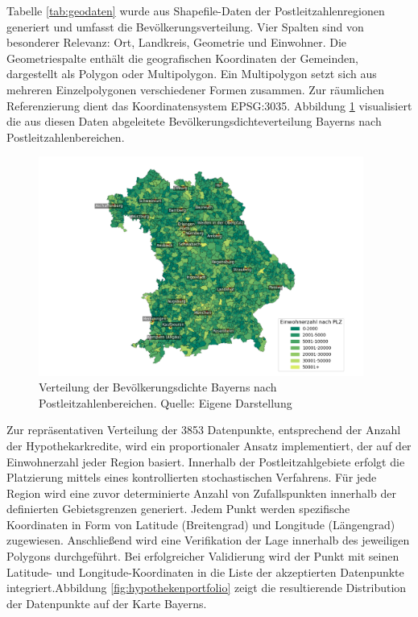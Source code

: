 Tabelle \ref{tab:geodaten} wurde aus Shapefile-Daten der Postleitzahlenregionen generiert und umfasst die Bevölkerungsverteilung. Vier Spalten sind von besonderer Relevanz: Ort, Landkreis, Geometrie und Einwohner. Die Geometriespalte enthält die geografischen Koordinaten der Gemeinden, dargestellt als Polygon oder Multipolygon. Ein Multipolygon setzt sich aus mehreren Einzelpolygonen verschiedener Formen zusammen. Zur räumlichen Referenzierung dient das Koordinatensystem EPSG:3035. Abbildung \ref{fig:bevoelkerungsdichte} visualisiert die aus diesen Daten abgeleitete Bevölkerungsdichteverteilung Bayerns nach Postleitzahlenbereichen.

\begin{figure}[htbp]
    \centering
    \includegraphics[width=0.95\textwidth]{figures/Bayern_pop_plz.png}
    \caption{Verteilung der Bevölkerungsdichte Bayerns nach Postleitzahlenbereichen. Quelle: Eigene Darstellung}
    \label{fig:bevoelkerungsdichte}
\end{figure}
\FloatBarrier

Zur repräsentativen Verteilung der 3853 Datenpunkte, entsprechend der Anzahl der Hypothekarkredite, wird ein proportionaler Ansatz implementiert, der auf der Einwohnerzahl jeder Region basiert. Innerhalb der Postleitzahlgebiete erfolgt die Platzierung mittels eines kontrollierten stochastischen Verfahrens. Für jede Region wird eine zuvor determinierte Anzahl von Zufallspunkten innerhalb der definierten Gebietsgrenzen generiert. Jedem Punkt werden spezifische Koordinaten in Form von Latitude (Breitengrad) und Longitude (Längengrad) zugewiesen. Anschließend wird eine Verifikation der Lage innerhalb des jeweiligen Polygons durchgeführt. Bei erfolgreicher Validierung wird der Punkt mit seinen Latitude- und Longitude-Koordinaten in die Liste der akzeptierten Datenpunkte integriert.Abbildung \ref{fig:hypothekenportfolio} zeigt die resultierende Distribution der Datenpunkte auf der Karte Bayerns.

